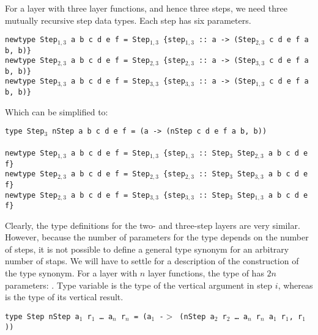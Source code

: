 \documentclass[preprint,natbib]{sigplanconf}
\begin{document}
For a layer with three layer functions, and hence three steps, we need three mutually recursive step data types. Each step has six parameters.

\begin{small}
{\tt newtype Step$_{1,3}$ a b c d e f = Step$_{1,3}$ \{step$_{1,3}$}\verb| :: |{\tt a -> (Step$_{2,3}$ c d e f a b, b)\}}\\
{\tt newtype Step$_{2,3}$ a b c d e f = Step$_{2,3}$ \{step$_{2,3}$}\verb| :: |{\tt a -> (Step$_{3,3}$ c d e f a b, b)\}}\\
{\tt newtype Step$_{3,3}$ a b c d e f = Step$_{3,3}$ \{step$_{3,3}$}\verb| :: |{\tt a -> (Step$_{1,3}$ c d e f a b, b)\}}
\end{small}

Which can be simplified to:

\begin{small}
{\tt type Step$_3$ nStep a b c d e f = (a -> (nStep c d e f a b, b))}\\
\\
{\tt newtype Step$_{1,3}$ a b c d e f = Step$_{1,3}$ \{step$_{1,3}$}\verb| :: |{\tt Step$_3$ Step$_{2,3}$ a b c d e f\} }\\
{\tt newtype Step$_{2,3}$ a b c d e f = Step$_{2,3}$ \{step$_{2,3}$}\verb| :: |{\tt Step$_3$ Step$_{3,3}$ a b c d e f\} }\\
{\tt newtype Step$_{2,3}$ a b c d e f = Step$_{3,3}$ \{step$_{3,3}$}\verb| :: |{\tt Step$_3$ Step$_{1,3}$ a b c d e f\} }
\end{small}

Clearly, the type definitions for the two- and three-step layers are very similar. However, because the number of parameters for the type depends on the number of steps, it is not possible to define a general type synonym  for an arbitrary number of staps. We will have to settle for a description of the construction of the type synonym. For a layer with $n$ layer functions, the type of  has $2n$ parameters: . Type variable  is the type of the vertical argument in step $i$, whereas  is the type of its vertical result. 

\begin{small}
\begin{tabbing}
{\tt type St}\={\tt ep nStep a$_1$ r$_1$ \dots ~a$_n$ r$_n$ = (a$_1$ -$>$  (nStep a$_2$ r$_2$ \dots ~a$_n$ r$_n$ a$_1$ r$_1$, r$_1$)) }
\end{tabbing}
\end{small}
\end{document}
